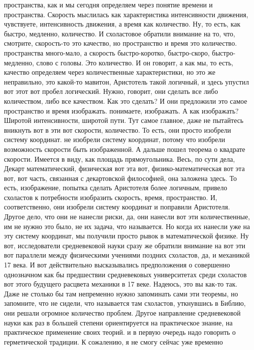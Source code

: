 пространства, как и мы сегодня определяем через понятие времени и пространства.
Скорость мыслилась как характеристика интенсивности движения, чувствуете,
интенсивность движения, а время как количество. Ну, то есть, как быстро,
медленно, количество. И схоластовое обратили внимание на то, что, смотрите,
скорость-то это качество, но пространство и время это количество. пространства
много-мало, а скорость быстро-коротко, быстро-скоро, быстро-медленно, слово с
головы. Это количество. И он говорит, а как мы, то есть, качество определяем
через количественные характеристики, но это же неправильно, это какой-то
мавитон, Аристотель такой логичный, и здесь упустил вот этот вот пробел
логический. Нужно, говорит, они сделать все либо количеством, либо все
качеством. Как это сделать? И они предложили это самое пространство и время
изображать. понимаете, изображать. А как изображать? Широтой интенсивности,
широтой пути. Тут самое главное, даже не пытайтесь вникнуть вот в эти вот
скорости, количество. То есть, они просто изобрели систему координат. не
изобрели систему координат, потому что изобрели возможность скорости быть
изображенной. А дальше пошел теорема о квадрате скорости. Имеется в виду, как
площадь прямоугольника. Весь, по сути дела, Декарт математический, физическая
вот эта вот, физико-математическая вот эта вот, вот часть, связанная с
декартовской философией, она заложена здесь. То есть, изображение, попытка
сделать Аристотеля более логичным, привело схоластов к потребности изобразить
скорость, время, пространство. И, соответственно, они изобрели систему координат
и поправили Аристотеля. Другое дело, что они не нанесли риски, да, они нанесли
вот эти количественные, им не нужно это было, не их задача, что называется. Но
когда их нанесли уже на эту систему координат, мы получили просто рывок в
математической физике. Ну вот, исследователи средневековой науки сразу же
обратили внимание на вот эти вот параллели между физическими учениями поздних
схоластов, да, и механикой 17 века. И вот действительно высказывались
предположения о совершенно однозначном как бы предшествии средневековых
университетах среди схоластов вот этого будущего расцвета механики в 17 веке.
Надеюсь, это вы как-то так. Даже не столько бы там непременно нужно запоминать
сами эти теоремы, но запомните, что не сидели, что называется там схоластов,
уткнувшись в Библию, они решали огромное количество проблем. Другое направление
средневековой науки как раз в большей степени ориентируется на практическое
знание, на практическое применение своих теорий. и в первую очередь надо
говорить о герметической традиции. К сожалению, я не смогу сейчас уже временно
